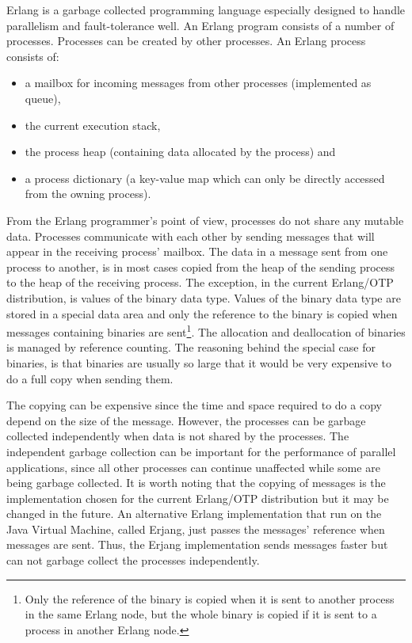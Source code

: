 \documentclass[aps,pre,preprint,nofootinbib]{revtex4}
\begin{document}
Erlang is a garbage collected programming language especially designed to handle parallelism and fault-tolerance well.
An Erlang program consists of a number of processes.
Processes can be created by other processes.
An Erlang process consists of:
\begin{itemize}
 \item a mailbox for incoming messages from other processes (implemented as queue),
 \item the current execution stack,
 \item the process heap (containing data allocated by the process) and
 \item a process dictionary (a key-value map which can only be directly accessed from the owning process).
\end{itemize}
From the Erlang programmer's point of view, processes do not share any mutable data.
Processes communicate with each other by sending messages that will appear in the receiving process' mailbox.
The data in a message sent from one process to another, is in most cases copied from the heap of the sending process to the heap of the receiving process.
The exception, in the current Erlang/OTP distribution, is values of the binary data type.
Values of the binary data type are stored in a special data area and only the reference to the binary is copied when messages containing binaries are sent\footnote{Only the reference of the binary is copied when it is sent to another process in the same Erlang node, but the whole binary is copied if it is sent to a process in another Erlang node.}.
The allocation and deallocation of binaries is managed by reference counting.
The reasoning behind the special case for binaries, is that binaries are usually so large that it would be very expensive to do a full copy when sending them.

The copying can be expensive since the time and space required to do a copy depend on the size of the message.
However, the processes can be garbage collected independently when data is not shared by the processes.
The independent garbage collection can be important for the performance of parallel applications, since all other processes can continue unaffected while some are being garbage collected.
It is worth noting that the copying of messages is the implementation chosen for the current Erlang/OTP distribution but it may be changed in the future.
An alternative Erlang implementation that run on the Java Virtual Machine, called Erjang, just passes the messages' reference when messages are sent.
Thus, the Erjang implementation sends messages faster but can not garbage collect the processes independently.
\end{document}
